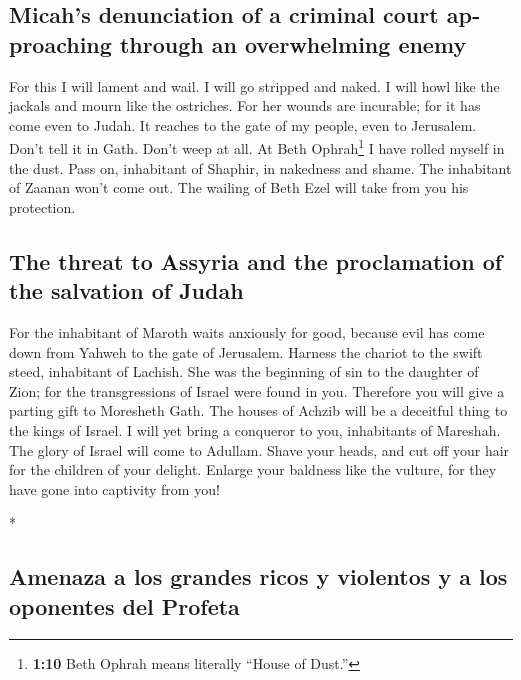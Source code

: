\begin{paracol}{2}
\begin{otherlanguage}{english}
{\subsection{Micah's denunciation of a criminal court approaching through
an overwhelming
enemy}\label{micahs-denunciation-of-a-criminal-court-approaching-through-an-overwhelming-enemy}}

 For this I will lament and wail. I will go stripped and
naked. I will howl like the jackals and mourn like the ostriches.
 For her wounds are incurable; for it has come even to
Judah. It reaches to the gate of my people, even to Jerusalem.
 Don't tell it in Gath. Don't weep at all. At Beth
Ophrah\footnote{\textbf{1:10} Beth Ophrah means literally ``House of
  Dust.''} I have rolled myself in the dust.  Pass on,
inhabitant of Shaphir, in nakedness and shame. The inhabitant of Zaanan
won't come out. The wailing of Beth Ezel will take from you his
protection.

\hypertarget{the-threat-to-assyria-and-the-proclamation-of-the-salvation-of-judah}{%
\subsection{The threat to Assyria and the proclamation of the salvation
of
Judah}\label{the-threat-to-assyria-and-the-proclamation-of-the-salvation-of-judah}}

 For the inhabitant of Maroth waits anxiously for good,
because evil has come down from Yahweh to the gate of Jerusalem.
 Harness the chariot to the swift steed, inhabitant of
Lachish. She was the beginning of sin to the daughter of Zion; for the
transgressions of Israel were found in you.  Therefore
you will give a parting gift to Moresheth Gath. The houses of Achzib
will be a deceitful thing to the kings of Israel.  I will
yet bring a conqueror to you, inhabitants of Mareshah. The glory of
Israel will come to Adullam.  Shave your heads, and cut
off your hair for the children of your delight. Enlarge your baldness
like the vulture, for they have gone into captivity from you!

\end{otherlanguage}

\switchcolumn[0]*

\hypertarget{amenaza-a-los-grandes-ricos-y-violentos-y-a-los-oponentes-del-profeta}{%
\subsection{Amenaza a los grandes ricos y violentos y a los oponentes
del
Profeta}\label{amenaza-a-los-grandes-ricos-y-violentos-y-a-los-oponentes-del-profeta}}


\end{paracol}
